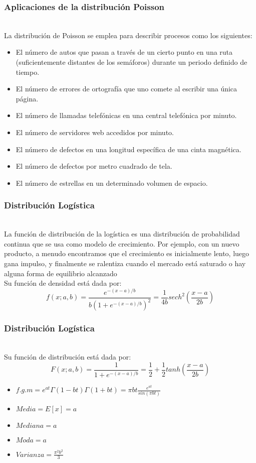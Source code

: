 \documentclass[11pt]{beamer}
\begin{document}
\begin{frame}
\frametitle{Aplicaciones de la distribución Poisson}
~\\La distribución de Poisson se emplea para describir procesos como los siguientes:  
\begin{itemize}
\item El n\'{u}mero de autos que pasan a través de un cierto punto en una ruta (suficientemente
distantes de los semáforos) durante un periodo definido de tiempo.  
\item El n\'{u}mero de errores de ortografía que uno comete al escribir una única página.  
\item El n\'{u}mero de llamadas telefónicas en una central telefónica por minuto.  
\item El n\'{u}mero de servidores web accedidos por minuto.  
\item El n\'{u}mero de defectos en una longitud específica de una cinta magnética.   
\item El n\'{u}mero de defectos por metro cuadrado de tela.
\item El n\'{u}mero de estrellas en un determinado volumen de espacio.
\end{itemize}
\end{frame}
\begin{frame}
\frametitle{Distribución Logística}
~\\La función de distribución de la logística es una distribución de probabilidad continua que se usa como modelo de crecimiento. Por ejemplo,
con un nuevo producto, a menudo encontramos que el crecimiento es inicialmente lento, luego gana impulso,
y finalmente se ralentiza cuando el mercado está saturado o hay alguna forma de equilibrio
alcanzado
~\\ Su función de densidad está dada por:
$$f(x;a,b)=\frac{e^{-(x-a)/b}}{b(1+e^{-(x-a)/b})^2}=\frac{1}{4b}sech^2\left(\frac{x-a}{2b}\right)$$
\end{frame}

\begin{frame}
\frametitle{Distribución Logística}
~\\ Su función de distribución está dada por:
$$F(x;a,b)=\frac{1}{1+e^{-(x-a)/b}}=\frac{1}{2}+\frac{1}{2}tanh\left(\frac{x-a}{2b}\right)$$
\begin{itemize}
\item $f.g.m=e^{at}\Gamma(1-bt)\Gamma(1+bt)=\pi bt\frac{e^{at}}{sin(\pi bt)}$
\item $Media=E[x]=a$
\item $Mediana=a$
\item $Moda=a$
\item $Varianza=\frac{\pi^2 b^2}{3}$
\end{itemize}
\end{frame}
\end{document}
